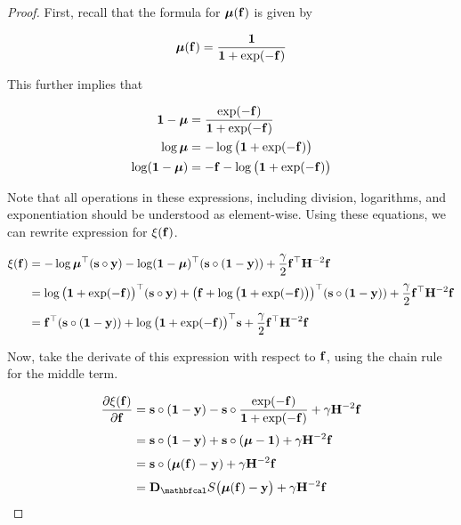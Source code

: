 \begin{proof}

    First, recall that the formula for $\boldsymbol{\mu}(\mathbf{f})$ is given by 

    \begin{equation}
        \boldsymbol{\mu}(\mathbf{f}) = \frac{\mathbf{1}}{\mathbf{1} + \exp(-\mathbf{f})}
    \end{equation}

    This further implies that

    \begin{align}
        \mathbf{1} - \boldsymbol{\mu} &= \frac{\exp(-\mathbf{f})}{\mathbf{1} + \exp(-\mathbf{f})} \\ 
        \log \boldsymbol{\mu} &= - \log\big(\mathbf{1} + \exp(-\mathbf{f}) \big) \\
        \log (\mathbf{1} - \boldsymbol{\mu}) &= - \mathbf{f}- \log\big(\mathbf{1} + \exp(-\mathbf{f}) \big) 
    \end{align}

    Note that all operations in these expressions, including division, logarithms, and exponentiation should be understood as element-wise. Using these equations, we can rewrite expression for $\xi(\mathbf{f})$. 

    \begin{align*}
        \xi(\mathbf{f}) &= - \log \boldsymbol{\mu}^\top (\mathbf{s} \circ \mathbf{y}) - \log(\mathbf{1} - \boldsymbol{\mu})^\top (\mathbf{s} \circ (\mathbf{1} - \mathbf{y})) + \frac{\gamma}{2} \mathbf{f}^\top \mathbf{H}^{-2} \mathbf{f} \\[0.1cm]
        &= \log\big(\mathbf{1} + \exp(-\mathbf{f})\big)^\top (\mathbf{s} \circ \mathbf{y})  +  \big( \mathbf{f} + \log\big(\mathbf{1} + \exp(-\mathbf{f}) \big)\big)^\top (\mathbf{s} \circ (\mathbf{1} - \mathbf{y}))  + \frac{\gamma}{2} \mathbf{f}^\top \mathbf{H}^{-2} \mathbf{f} \\[0.1cm]
        &= \mathbf{f}^\top (\mathbf{s} \circ (\mathbf{1} - \mathbf{y})) + \log\big(\mathbf{1} + \exp(-\mathbf{f}) \big)^\top \mathbf{s} + \frac{\gamma}{2} \mathbf{f}^\top \mathbf{H}^{-2} \mathbf{f} 
    \end{align*}
    
    Now, take the derivate of this expression with respect to $\mathbf{f}$, using the chain rule for the middle term. 

    \begin{align*}
        \frac{\partial \xi(\f)}{\partial \f} &= \s \circ (\one - \y) - \s \circ \frac{\exp(-\f)}{\one + \exp(-\f)}  + \gamma \HH^{-2} \f \\[0.1cm]
        &= \s \circ (\one - \y) + \s \circ (\muu - \one)  + \gamma \HH^{-2} \f \\[0.1cm]
        &= \s \circ (\muu(\f) - \y) + \gamma \HH^{-2} \f \\[0.1cm]
        &= \D_\St \big(\muu(\f) - \y\big) + \gamma \HH^{-2} \f
    \end{align*}


\end{proof}

